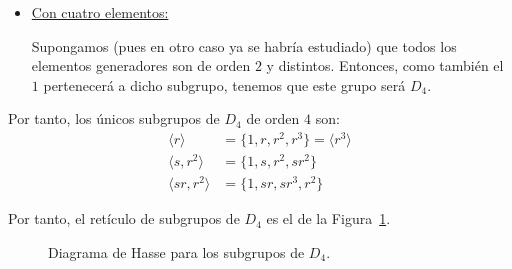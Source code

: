 \begin{ejercicio}
\begin{enumerate}
\begin{itemize}
            \item \ul{Con cuatro elementos:}
            
            Supongamos (pues en otro caso ya se habría estudiado) que todos los elementos generadores son de orden $2$ y distintos. Entonces, como también el $1$ pertenecerá a dicho subgrupo, tenemos que este grupo será $D_4$.
        \end{itemize}

        Por tanto, los únicos subgrupos de $D_4$ de orden $4$ son:
        \begin{align*}
            \langle r\rangle &= \{1,r,r^2,r^3\} = \langle r^3\rangle\\
            \langle s, r^2\rangle &= \{1,s,r^2,sr^2\}\\
            \langle sr, r^2\rangle &= \{1,sr,sr^3,r^2\}
        \end{align*}

        Por tanto, el retículo de subgrupos de $D_4$ es el de la Figura~\ref{fig:ej11_D4}.
        \begin{figure}
            \centering
            \caption{Diagrama de Hasse para los subgrupos de $D_4$.}
            \label{fig:ej11_D4}
        \end{figure}




\end{enumerate}
\end{ejercicio}
